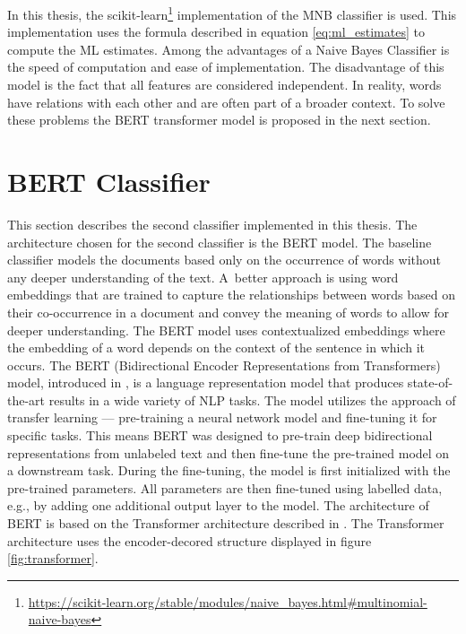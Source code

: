 In this thesis, the scikit-learn\footnote{\url{https://scikit-learn.org/stable/modules/naive_bayes.html\#multinomial-naive-bayes}} implementation of the MNB classifier is used. This implementation uses the formula described in equation \ref{eq:ml_estimates} to compute the ML estimates.
Among the advantages of a Naive Bayes Classifier is the speed of computation and ease of implementation. The disadvantage of this model is the fact that all features are considered independent. In reality, words have relations with each other and are often part of a broader context. To solve these problems the BERT transformer model is proposed in the next section. 






\section{BERT Classifier}
\label{sec:bert}
This section describes the second classifier implemented in this thesis. The architecture chosen for the second classifier is the BERT model. The baseline classifier models the documents based only on the occurrence of words without any deeper understanding of the text. A~better approach is using word embeddings that are trained to capture the relationships between words based on their co-occurrence in a document and convey the meaning of words to allow for deeper understanding. The BERT model uses contextualized embeddings where the embedding of a word depends on the context of the sentence in which it occurs.
The BERT (Bidirectional Encoder Representations from Transformers) model, introduced in \cite{bert}, is a language representation model that produces state-of-the-art results in a wide variety of NLP tasks. The model utilizes the approach of transfer learning --- pre-training a neural network model and fine-tuning it for specific tasks. This means BERT was designed to pre-train deep bidirectional representations from unlabeled text and then fine-tune the pre-trained model on a downstream task. During the fine-tuning, the model is first initialized with the pre-trained parameters. All parameters are then fine-tuned using labelled data, e.g., by adding one additional output layer to the model.
The architecture of BERT is based on the Transformer architecture described in \cite{transformer}. The Transformer architecture uses the encoder-decored structure displayed in figure \ref{fig:transformer}.


